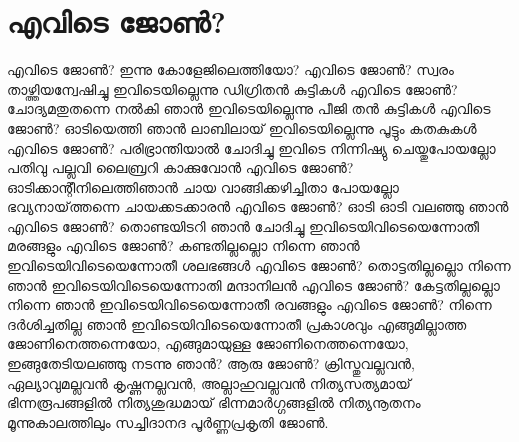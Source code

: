 \chapter{എവിടെ ജോൺ?}
\obeylines
\noindent
എവിടെ ജോൺ?
ഇന്നു കോളേജിലെത്തിയോ? 
എവിടെ ജോൺ? 
സ്വരം താഴ്ത്തിയന്വേഷിച്ചു 
ഇവിടെയില്ലെന്നു ഡിഗ്രിതൻ കുട്ടികൾ 
എവിടെ  ജോൺ?  
ചോദ്യമതുതന്നെ നൽകി ഞാൻ 
ഇവിടെയില്ലെന്നു പീജി തൻ കുട്ടികൾ 
എവിടെ ജോൺ? 
ഓടിയെത്തി ഞാൻ ലാബിലായ് 
ഇവിടെയില്ലെന്നു പൂട്ടും കതകുകൾ 
എവിടെ ജോൺ? 
പരിഭ്രാന്തിയാൽ ചോദിച്ചു 
ഇവിടെ നിന്നിഷ്യു ചെയ്തുപോയല്ലോ 
പതിവു പല്ലവി ലൈബ്രറി കാക്കുവോൻ 
എവിടെ ജോൺ? 
ഓടിക്കാന്റീനിലെത്തിഞാൻ 
ചായ വാങ്ങിക്കഴിച്ചിതാ പോയല്ലോ 
ഭവ്യനായ്‌ത്തന്നെ ചായക്കടക്കാരൻ 
എവിടെ ജോൺ? 
ഓടി ഓടി വലഞ്ഞു ഞാൻ 
എവിടെ ജോൺ? 
തൊണ്ടയിടറി ഞാൻ ചോദിച്ചു 
ഇവിടെയിവിടെയെന്നോതീ മരങ്ങളും 
എവിടെ ജോൺ? 
കണ്ടതില്ലല്ലൊ നിന്നെ ഞാൻ 
ഇവിടെയിവിടെയെന്നോതീ ശലഭങ്ങൾ 
എവിടെ ജോൺ? 
തൊട്ടതില്ലല്ലൊ നിന്നെ ഞാൻ 
ഇവിടെയിവിടെയെന്നോതി മന്ദാനിലൻ 
എവിടെ ജോൺ? 
കേട്ടതില്ലല്ലൊ നിന്നെ ഞാൻ 
ഇവിടെയിവിടെയെന്നോതീ രവങ്ങളും  
എവിടെ ജോൺ? 
നിന്നെ ദർശിച്ചതില്ല ഞാൻ 
ഇവിടെയിവിടെയെന്നോതീ പ്രകാശവും 
എങ്ങുമില്ലാത്ത ജോണിനെത്തന്നെയോ,
എങ്ങുമായുള്ള ജോണിനെത്തന്നെയോ,
ഇങ്ങുതേടിയലഞ്ഞു നടന്നു ഞാൻ?
ആരു ജോൺ? 
ക്രിസ്തുവല്ലവൻ, ഏല്യാവുമല്ലവൻ 
കൃഷ്ണനല്ലവൻ, അല്ലാഹുവല്ലവൻ 
നിത്യസത്യമായ് ഭിന്നരൂപങ്ങളിൽ 
നിത്യശുദ്ധമായ് ഭിന്നമാർഗ്ഗങ്ങളിൽ 
നിത്യനൂതനം മൂന്നുകാലത്തിലും 
സച്ചിദാനദ പൂർണ്ണപ്രകൃതി ജോൺ.
